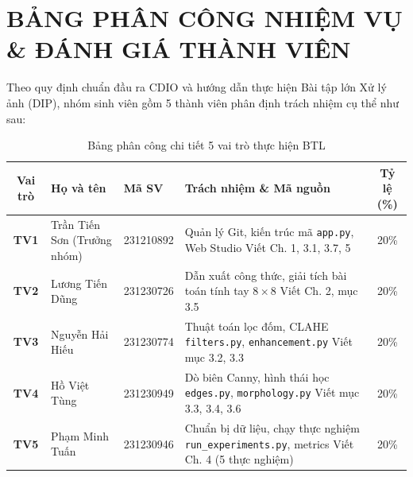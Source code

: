 \documentclass[12pt,a4paper]{report}
\begin{document}
\newpage
{}
\section*{BẢNG PHÂN CÔNG NHIỆM VỤ \& ĐÁNH GIÁ THÀNH VIÊN}

Theo quy định chuẩn đầu ra CDIO và hướng dẫn thực hiện Bài tập lớn Xử lý ảnh (DIP), nhóm sinh viên gồm 5 thành viên phân định trách nhiệm cụ thể như sau:

\begin{table}[H]
\centering
\small
\setlength{\tabcolsep}{4pt}\setlength{\extrarowheight}{3pt}
\begin{tabularx}{\textwidth}{|c|>{\raggedright\arraybackslash}p{3.6cm}|l|>{\raggedright\arraybackslash}X|c|}
\hline
\textbf{Vai trò} & \textbf{Họ và tên} & \textbf{Mã SV} & \textbf{Trách nhiệm \& Mã nguồn} & \textbf{Tỷ lệ (\%)} \\
\hline
\textbf{TV1} & Trần Tiến Sơn \newline (Trưởng nhóm) & 231210892 & Quản lý Git, kiến trúc mã \newline \texttt{app.py}, Web Studio \newline Viết Ch. 1, 3.1, 3.7, 5 & 20\% \\
\hline
\textbf{TV2} & Lương Tiến Dũng & 231230726 & Dẫn xuất công thức, giải tích \newline 5 bài toán tính tay $8\times 8$ \newline Viết Ch. 2, mục 3.5 & 20\% \\
\hline
\textbf{TV3} & Nguyễn Hải Hiếu & 231230774 & Thuật toán lọc đốm, CLAHE \newline \texttt{filters.py}, \texttt{enhancement.py} \newline Viết mục 3.2, 3.3 & 20\% \\
\hline
\textbf{TV4} & Hồ Việt Tùng & 231230949 & Dò biên Canny, hình thái học \newline \texttt{edges.py}, \texttt{morphology.py} \newline Viết mục 3.3, 3.4, 3.6 & 20\% \\
\hline
\textbf{TV5} & Phạm Minh Tuấn & 231230946 & Chuẩn bị dữ liệu, chạy thực nghiệm \newline \texttt{run\_experiments.py}, metrics \newline Viết Ch. 4 (5 thực nghiệm) & 20\% \\
\hline
\end{tabularx}
\caption{Bảng phân công chi tiết 5 vai trò thực hiện BTL}
\end{table}
\end{document}
